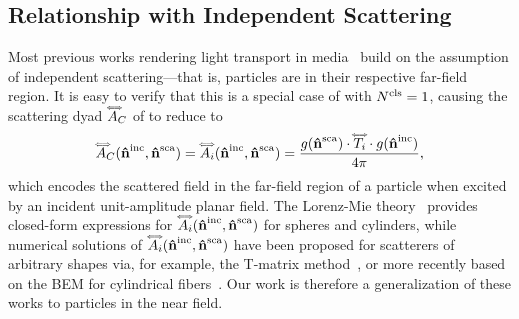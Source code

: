 


\subsection{Relationship with Independent Scattering}
\label{ssec:ours_indep_scat}
%
Most previous works rendering light transport in media~\cite{novak2018monte} build on the assumption of independent scattering---that is, particles are in their respective far-field region.
It is easy to verify that this is a special case of  with ${N^\text{cls}}=1$, causing 
the scattering dyad $\accentset{\Longleftrightarrow}{A}_C$ of  to reduce to
%
\begin{equation}
    \label{eq:farscatmie}
    \accentset{\Longleftrightarrow}{A}_C(\mathbf{\hat{n}}^{\text{inc}},\mathbf{\hat{n}}^{\text{sca}}) = \accentset{\Longleftrightarrow}{A}_i(\mathbf{\hat{n}}^{\text{inc}},\mathbf{\hat{n}}^{\text{sca}}) = \frac{g(\mathbf{\hat{n}}^{\text{sca}})\cdot \accentset{\Longleftrightarrow}{T}_i  \cdot g(\mathbf{\hat{n}}^{\text{inc}})}{4\pi},
\end{equation}
%
which encodes the scattered field in the far-field region of a particle when excited by an incident unit-amplitude planar field. 
%
The Lorenz-Mie theory~\cite{hulst1981light} provides closed-form expressions for $\accentset{\Longleftrightarrow}{A}_i(\mathbf{\hat{n}}^{\text{inc}},\mathbf{\hat{n}}^{\text{sca}})$ for spheres and cylinders, while numerical solutions of $\accentset{\Longleftrightarrow}{A}_i(\mathbf{\hat{n}}^{\text{inc}},\mathbf{\hat{n}}^{\text{sca}})$ have been proposed for scatterers of arbitrary shapes via, for example, the T-matrix method~\cite{waterman1965matrix}, or more recently based on the BEM for cylindrical fibers~\cite{xia2020wave}. Our work is therefore a generalization of these works to particles in the near field. 
